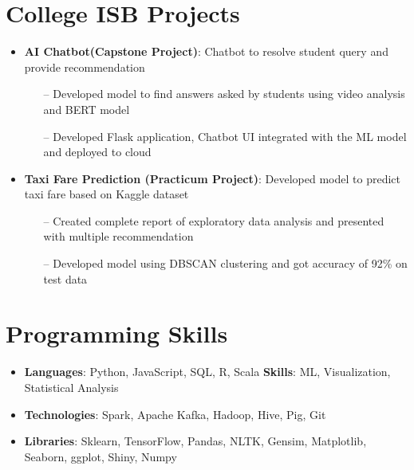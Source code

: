 \documentclass[letterpaper,11pt]{article}
\newcommand{\resumeItem}[2]{
  \item\small{
    \textbf{#1}{: #2 \vspace{-2pt}}
  }
}
\newcommand{\resumeSubItem}[2]{\resumeItem{#1}{#2}\vspace{-4pt}}
\newcommand{\resumeSubHeadingListStart}{\begin{itemize}[leftmargin=*]}
\newcommand{\resumeSubHeadingListEnd}{\end{itemize}}
\begin{document}
\section{College ISB Projects}
  \resumeSubHeadingListStart
    \resumeSubItem{AI Chatbot(Capstone Project)}
      {Chatbot to resolve student query and provide recommendation}
        \begin{itemize}
            \item[--] Developed model to find answers asked by students using video analysis and BERT model
            \item[--] Developed Flask application, Chatbot UI integrated with the ML model and deployed to cloud
        \end{itemize}
    \resumeSubItem{Taxi Fare Prediction (Practicum Project)}
      {Developed model to predict taxi fare based on Kaggle dataset}
        \begin{itemize}
            \item[--] Created complete report of exploratory data analysis and presented with multiple recommendation
            \item[--] Developed model using DBSCAN clustering and got accuracy of 92\% on test data
        \end{itemize}
  \resumeSubHeadingListEnd

\section{Programming Skills}
 \resumeSubHeadingListStart
   \item{
     \textbf{Languages}{: Python, JavaScript, SQL, R, Scala}
     \hfill
     \textbf{Skills}{: ML, Visualization, Statistical Analysis}
   }
   \item {
     \textbf{Technologies}{: Spark, Apache Kafka, Hadoop, Hive, Pig, Git}
   }
   \item {
     \textbf{Libraries}{: Sklearn, TensorFlow, Pandas, NLTK, Gensim, Matplotlib, Seaborn, ggplot, Shiny, Numpy}
   }
 \resumeSubHeadingListEnd


\end{document}

